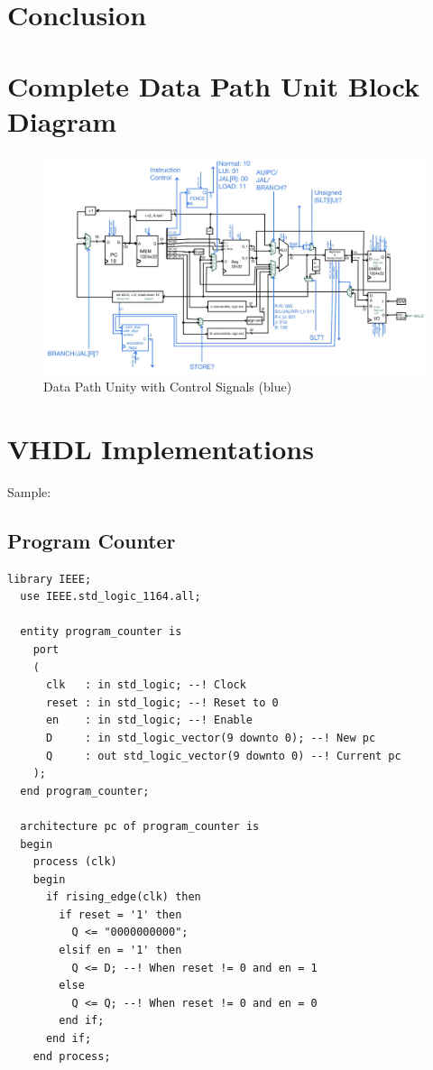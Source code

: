 \documentclass[lettersize,journal]{IEEEtran}
\begin{document}
\section{Conclusion}
\color{red}{TBD}\color{black}

{\appendices
\section*{Complete Data Path Unit Block Diagram}
\begin{figure}[!h]
  \label{fig:dpu}
  \centering
  \includegraphics[width=16cm, angle=270]{DPU.jpg}
  \caption{Data Path Unity with Control Signals (blue)}
\end{figure}

\section*{VHDL Implementations}
Sample:
\color{red}{TBD due to current overfull issues...}\color{black}\\
\subsection{Program Counter}
\begin{Verbatim}[breaklines]
  library IEEE;
  use IEEE.std_logic_1164.all;
  
  entity program_counter is
    port
    (
      clk   : in std_logic; --! Clock
      reset : in std_logic; --! Reset to 0
      en    : in std_logic; --! Enable
      D     : in std_logic_vector(9 downto 0); --! New pc
      Q     : out std_logic_vector(9 downto 0) --! Current pc
    );
  end program_counter;
  
  architecture pc of program_counter is
  begin
    process (clk)
    begin
      if rising_edge(clk) then
        if reset = '1' then
          Q <= "0000000000";
        elsif en = '1' then
          Q <= D; --! When reset != 0 and en = 1
        else
          Q <= Q; --! When reset != 0 and en = 0
        end if;
      end if;
    end process;
  

\end{Verbatim}}
\end{document}
